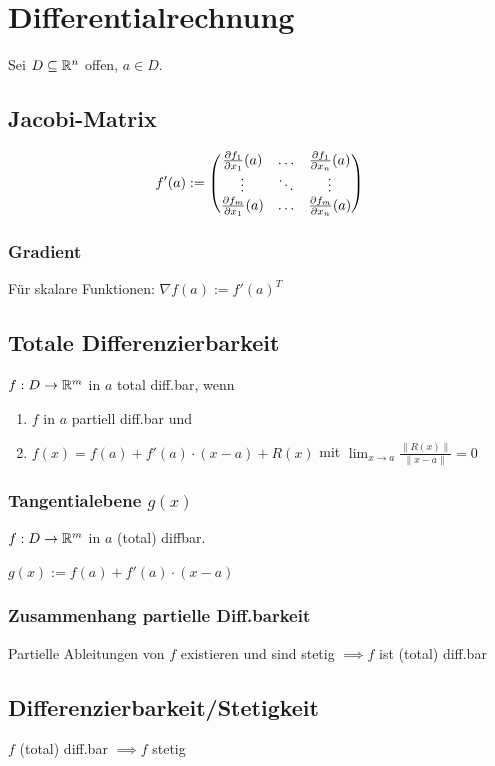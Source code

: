 \section*{Differentialrechnung}
Sei $D\subseteq \mathbb{R}^n$ offen, $a\in D$.

\subsection*{Jacobi-Matrix}
\[
	f'(a) := \begin{pmatrix} 
		\frac{\partial f_1}{\partial x_1}(a) & \ldots & \frac{\partial f_1}{\partial x_n}(a) \\
		\vdots & \ddots & \vdots \\
		\frac{\partial f_m}{\partial x_1}(a) & \ldots & \frac{\partial f_m}{\partial x_n}(a)
	 \end{pmatrix}
\]

\subsubsection*{Gradient}
Für skalare Funktionen: $\nabla f(a) := f'(a)^T$

\subsection*{Totale Differenzierbarkeit}
$f: D \to \mathbb{R}^m$ in $a$ total diff.bar, wenn
\begin{enumerate}
	\item $f$ in $a$ partiell diff.bar und
	\item $f(x)=f(a)+f'(a)\cdot(x-a) + R(x)$ mit $\lim_{x\to a}\frac{\|R(x)\|}{\|x-a\|}=0$
\end{enumerate}

\subsubsection*{Tangentialebene $g(x)$}
$f: D \to \mathbb{R}^m$ in $a$ (total) diffbar.

$g(x) := f(a) + f'(a)\cdot(x-a)$

\subsubsection*{Zusammenhang partielle Diff.barkeit}
Partielle Ableitungen von $f$ existieren und sind stetig
$\implies f$ ist (total) diff.bar

\subsection*{Differenzierbarkeit/Stetigkeit}
$f$ (total) diff.bar $\implies f$ stetig

